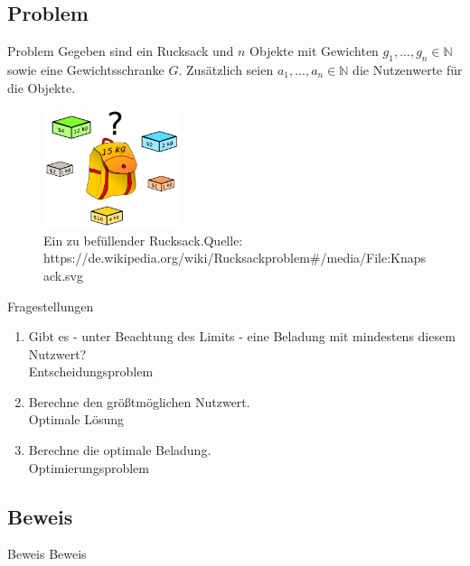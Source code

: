 \documentclass[12pt,donthandout,notes=dontshow,xcolor=table]{beamer}
\begin{document}
\subsection{Problem}
\begin{frame}{Problem}
Gegeben sind ein Rucksack und \(n\) Objekte mit Gewichten \(g_1,...,g_n \in \mathbb{N}\) sowie eine Gewichtsschranke \(G\).
Zusätzlich seien \(a_1,...,a_n \in \mathbb{N}\) die Nutzenwerte für die Objekte. \cite{wegener}
\pause
\begin{figure}
\includegraphics[width=4cm]{figures/knapsack.png}
\caption{Ein zu befüllender Rucksack.\newline \newline \tiny Quelle: https://de.wikipedia.org/wiki/Rucksackproblem\#/media/File:Knapsack.svg}
\end{figure}
\end{frame}

\begin{frame}{Fragestellungen}
\begin{enumerate}
\item Gibt es - unter Beachtung des Limits - eine Beladung mit mindestens diesem Nutzwert?\\
\textrightarrow Entscheidungsproblem
\newline \pause
\item Berechne den größtmöglichen Nutzwert.\\
\textrightarrow Optimale Lösung
\newline \pause
\item Berechne die optimale Beladung.\\
\textrightarrow Optimierungsproblem
\end{enumerate}
\end{frame}

\subsection{Beweis}
\begin{frame}{Beweis}
Beweis
\end{frame}
\end{document}
